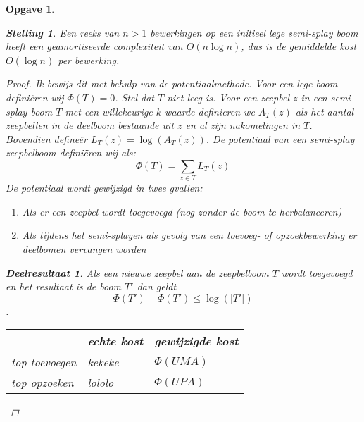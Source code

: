 \documentclass[12pt,hidelinks]{article}
\newtheorem{opgave}{Opgave}
\newtheorem{stelling}{Stelling}
\newtheorem{deelresultaat}{Deelresultaat}
\begin{document}
\begin{opgave}
\begin{description}
                \begin{stelling}
                    Een reeks van $n > 1$ bewerkingen op een initieel lege semi-splay boom heeft een geamortiseerde complexiteit van $O(n \log n)$, dus is de gemiddelde kost $O(\log n)$ per bewerking.
                    \begin{proof}
                        Ik bewijs dit met behulp van de potentiaalmethode. Voor een lege boom definiëren wij $\Phi(T)=0$.
                        Stel dat $T$ niet leeg is. 
                        Voor een zeepbel $z$ in een semi-splay boom $T$ met een willekeurige $k$-waarde definieren we $A_T(z)$ als het aantal zeepbellen in de deelboom bestaande uit
                        $z$ en al zijn nakomelingen in $T$. Bovendien defineër $L_T(z) = \log(A_T(z))$.
                        De potentiaal van een semi-splay zeepbelboom definiëren wij als:
                        \begin{equation}
                            \Phi(T) = \sum _{z\in T}{L_T(z)}
                        \end{equation}
                        De potentiaal wordt gewijzigd in twee gvallen:
                        \begin{enumerate}[1.]
                            \item Als er een zeepbel wordt toegevoegd (nog zonder de boom te herbalanceren)
                            \item Als tijdens het semi-splayen als gevolg van een toevoeg- of opzoekbewerking er deelbomen vervangen worden
                        \end{enumerate}
                        \begin{deelresultaat}
                            Als een nieuwe zeepbel aan de zeepbelboom $T$ wordt toegevoegd en het resultaat is de boom $T'$ dan geldt $$\Phi(T')-\Phi(T')\le\log(|T'|)$$.
                        \end{deelresultaat}

                        \begin{center}
                            \begin{tabular}{ l | l | p{5cm} }
                                & echte kost & gewijzigde kost \\ \hline
                                top toevoegen & kekeke & $\Phi(U MA)$ \\ \hline
                                top opzoeken & lololo &  $\Phi(U PA)$
                            \end{tabular}
                        \end{center}
                    \end{proof}
                \end{stelling}
        \end{description}
    \end{opgave}
\end{document}
